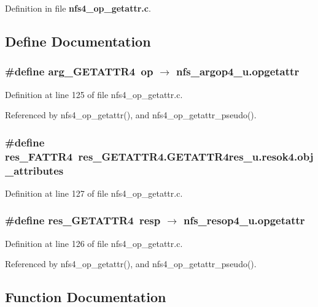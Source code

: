Definition in file {\bf nfs4\_\-op\_\-getattr.c}.

\subsection{Define Documentation}
\subsubsection{\setlength{\rightskip}{0pt plus 5cm}\#define arg\_\-GETATTR4\ op $\rightarrow$ nfs\_\-argop4\_\-u.opgetattr}\label{nfs4__op__getattr_8c_a0}




Definition at line 125 of file nfs4\_\-op\_\-getattr.c.

Referenced by nfs4\_\-op\_\-getattr(), and nfs4\_\-op\_\-getattr\_\-pseudo().
\subsubsection{\setlength{\rightskip}{0pt plus 5cm}\#define res\_\-FATTR4\ res\_\-GETATTR4.GETATTR4res\_\-u.resok4.obj\_\-attributes}\label{nfs4__op__getattr_8c_a2}




Definition at line 127 of file nfs4\_\-op\_\-getattr.c.
\subsubsection{\setlength{\rightskip}{0pt plus 5cm}\#define res\_\-GETATTR4\ resp $\rightarrow$ nfs\_\-resop4\_\-u.opgetattr}\label{nfs4__op__getattr_8c_a1}




Definition at line 126 of file nfs4\_\-op\_\-getattr.c.

Referenced by nfs4\_\-op\_\-getattr(), and nfs4\_\-op\_\-getattr\_\-pseudo().

\subsection{Function Documentation}
